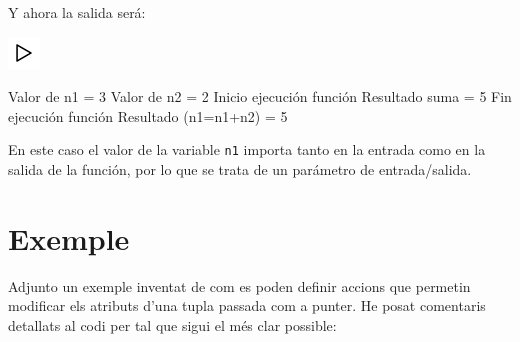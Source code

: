 \documentclass[]{book}
\newenvironment{Shaded}{\begin{snugshade}}{\end{snugshade}}
\newcommand{\DataTypeTok}[1]{\textcolor[rgb]{0.13,0.29,0.53}{#1}}
\newcommand{\DecValTok}[1]{\textcolor[rgb]{0.00,0.00,0.81}{#1}}
\newcommand{\SpecialCharTok}[1]{\textcolor[rgb]{0.00,0.00,0.00}{#1}}
\newcommand{\StringTok}[1]{\textcolor[rgb]{0.31,0.60,0.02}{#1}}
\newcommand{\NormalTok}[1]{#1}
\begin{document}
\begin{Shaded}
\end{Shaded}

Y ahora la salida será:

\includegraphics{./img/play.png}

\begin{Shaded}
\begin{Highlighting}[]
\NormalTok{Valor de n1 = }\DecValTok{3}
\NormalTok{Valor de n2 = }\DecValTok{2}
\NormalTok{Inicio ejecución función}
\NormalTok{Resultado suma = }\DecValTok{5}
\NormalTok{Fin ejecución función}
\NormalTok{Resultado (n1=n1+n2) = }\DecValTok{5}
\end{Highlighting}
\end{Shaded}

En este caso el valor de la variable \texttt{n1} importa tanto en la
entrada como en la salida de la función, por lo que se trata de un
parámetro de entrada/salida.

\section{Exemple}\label{exemple-1}

Adjunto un exemple inventat de com es poden definir accions que permetin
modificar els atributs d'una tupla passada com a punter. He posat
comentaris detallats al codi per tal que sigui el més clar possible:
\end{document}
